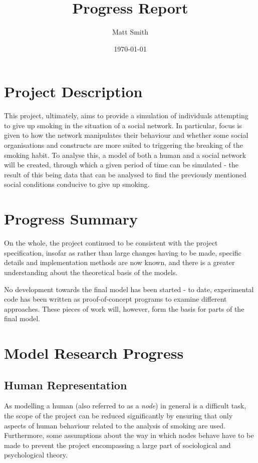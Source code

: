 \documentclass[]{article}
\begin{document}
\title{Progress Report}
\author{Matt Smith}
\date{\today}
\maketitle

\section{Project Description}

This project, ultimately, aims to provide a simulation of individuals attempting to give up smoking in the situation of a social network. In particular, focus is given to how the network manipulates their behaviour and whether some social organisations and constructs are more suited to triggering the breaking of the smoking habit. To analyse this, a model of both a human and a social network will be created, through which a given period of time can be simulated - the result of this being data that can be analysed to find the previously mentioned social conditions conducive to give up smoking.

\section{Progress Summary}

On the whole, the project continued to be consistent with the project specification, insofar as rather than large changes having to be made, specific details and implementation methods are now known, and there is a greater understanding about the theoretical basis of the models.

No development towards the final model has been started - to date, experimental code has been written as proof-of-concept programs to examine different approaches. These pieces of work will, however, form the basis for parts of the final model.

\section{Model Research Progress}

\subsection{Human Representation}

As modelling a human (also referred to as a \emph{node}) in general is a difficult task, the scope of the project can be reduced significantly by ensuring that only aspects of human behaviour related to the analysis of smoking are used. Furthermore, some assumptions about the way in which nodes behave have to be made to prevent the project encompassing a large part of sociological and psychological theory. 
\end{document}
